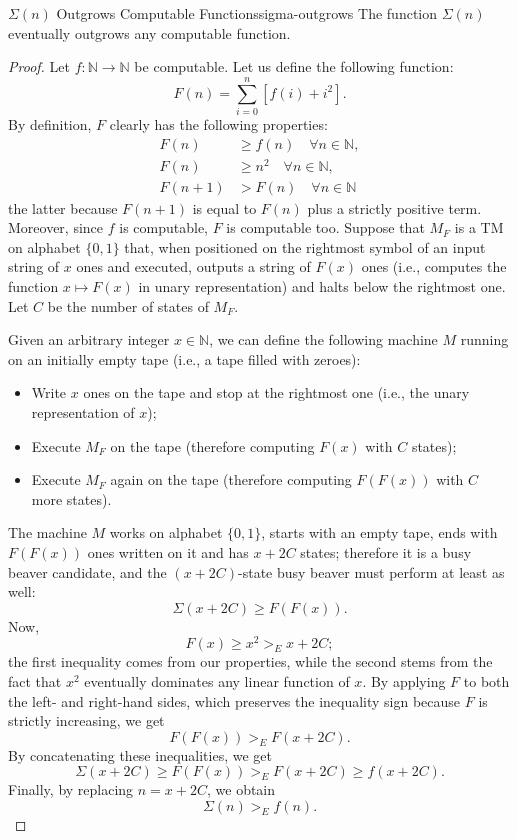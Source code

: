 \begin{theorem}{\(\Sigma(n)\) Outgrows Computable Functions}{sigma-outgrows}
    The function \(\Sigma(n)\) eventually outgrows any computable function.
    \begin{proof}
        Let \(f : \mathbb{N} \rightarrow \mathbb{N}\) be computable. Let us define the following function:
        \[
        F(n) = \sum_{i=0}^{n} [f(i) + i^2].
        \]
        By definition, \(F\) clearly has the following properties:
        \begin{align*}
            F(n) &\ge f(n) \quad \forall n \in \mathbb{N}, \\
            F(n) &\ge n^2 \quad \forall n \in \mathbb{N}, \\
            F(n + 1) &> F(n) \quad \forall n \in \mathbb{N}
        \end{align*}
        the latter because \(F(n + 1)\) is equal to \(F(n)\) plus a strictly positive term. Moreover, since \(f\) is computable, \(F\) is computable too. Suppose that \(M_F\) is a TM on alphabet \(\{0, 1\}\) that, when positioned on the rightmost symbol of an input string of \(x\) ones and executed, outputs a string of \(F(x)\) ones (i.e., computes the function \(x \mapsto F(x)\) in unary representation) and halts below the rightmost one. Let \(C\) be the number of states of \(M_F\).
        
        Given an arbitrary integer \(x \in \mathbb{N}\), we can define the following machine \(M\) running on an initially empty tape (i.e., a tape filled with zeroes):
        \begin{itemize}
            \item Write \(x\) ones on the tape and stop at the rightmost one (i.e., the unary representation of \(x\));
            \item Execute \(M_F\) on the tape (therefore computing \(F(x)\) with \(C\) states);
            \item Execute \(M_F\) again on the tape (therefore computing \(F(F(x))\) with \(C\) more states).
        \end{itemize}
        The machine \(M\) works on alphabet \(\{0, 1\}\), starts with an empty tape, ends with \(F(F(x))\) ones written on it and has \(x + 2C\) states; therefore it is a busy beaver candidate, and the \((x + 2C)\)-state busy beaver must perform at least as well:
        \[
        \Sigma(x + 2C) \ge F(F(x)).
        \]
        Now,
        \[
        F(x) \ge x^2 >_E x + 2C;
        \]
        the first inequality comes from our properties, while the second stems from the fact that \(x^2\) eventually dominates any linear function of \(x\). By applying \(F\) to both the left- and right-hand sides, which preserves the inequality sign because \(F\) is strictly increasing, we get
        \[
        F(F(x)) >_E F(x + 2C).
        \]
        By concatenating these inequalities, we get
        \[
        \Sigma(x + 2C) \ge F(F(x)) >_E F(x + 2C) \ge f(x + 2C).
        \]
        Finally, by replacing \(n = x + 2C\), we obtain
        \[
        \Sigma(n) >_E f(n).
        \]
    \end{proof}
\end{theorem}

